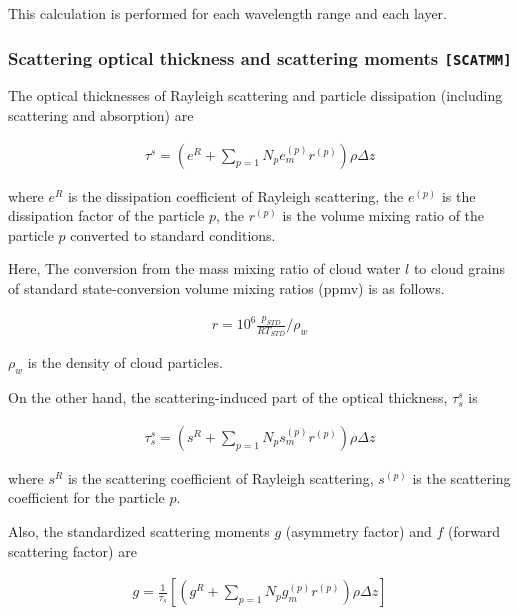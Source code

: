 This calculation is performed for each wavelength range and each layer.

\hypertarget{scattering-optical-thickness-and-scattering-moments-scatmm}{%
\subsubsection{\texorpdfstring{Scattering optical thickness and
scattering moments
\texttt{{[}SCATMM{]}}}{Scattering optical thickness and scattering moments {[}SCATMM{]}}}\label{scattering-optical-thickness-and-scattering-moments-modulescatmm}}

The optical thicknesses of Rayleigh scattering and particle dissipation
(including scattering and absorption) are

\begin{eqnarray}
\tau^{s} 
 = \left( e^R + \sum_{p=1}{N_p} e^{(p)}_m r^{(p)}\right) \rho \Delta z
\end{eqnarray}

where \(e^R\) is the dissipation coefficient of Rayleigh scattering, the
\(e^{(p)}\) is the dissipation factor of the particle \(p\), the \(r^{(p)}\) is
the volume mixing ratio of the
particle \(p\) converted to standard conditions.

Here, The conversion from the mass mixing ratio of cloud water \(l\) to cloud grains of standard state-conversion volume mixing ratios (ppmv) is
as follows.

\begin{eqnarray}
  r = 10^6 \frac{p_{STD}}{R T_{STD}}/\rho_w
\end{eqnarray}

\(\rho_w\) is the density of cloud particles.

On the other hand, the scattering-induced part of the optical thickness,
\(\tau_s^s\) is

\begin{eqnarray}
\tau_s^{s} 
 = \left( s^R + \sum_{p=1}{N_p} s^{(p)}_m r^{(p)}\right) \rho \Delta z
\end{eqnarray}

where \(s^R\) is the scattering coefficient of Rayleigh scattering,
\(s^{(p)}\) is the scattering coefficient for the particle \(p\).

Also, the standardized scattering moments \(g\) (asymmetry factor) and
\(f\) (forward scattering factor) are

\begin{eqnarray}
g = \frac{1}{\tau_s} \left[
    \left( g^R + \sum_{p=1}{N_p} g^{(p)}_m r^{(p)}\right) \rho \Delta z
    \right]
\end{eqnarray}


